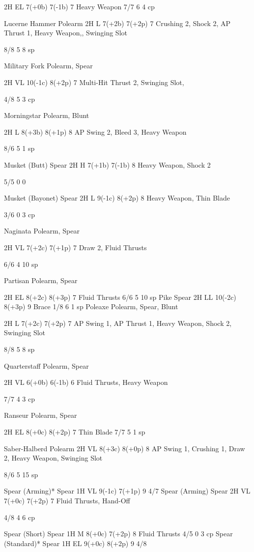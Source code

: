 \documentclass[oneside,11pt,english]{book}
\begin{document}
2H EL 7(+0b) 7(-1b) 7 Heavy Weapon 7/7 6 4 cp 

Lucerne Hammer Polearm 2H L 7(+2b) 7(+2p) 7 Crushing 2, Shock 
2, AP Thrust 1, 
Heavy Weapon,, 
Swinging Slot 

8/8 5 8 sp 

Military Fork Polearm, 
Spear 

2H VL 10(-1c) 8(+2p) 7 Multi-Hit Thrust 2, 
Swinging Slot, 

4/8 5 3 cp 

Morningstar Polearm, 
Blunt 

2H L 8(+3b) 8(+1p) 8 AP Swing 2, Bleed 
3, Heavy Weapon 

8/6 5 1 sp 

Musket (Butt) Spear 2H H 7(+1b) 7(-1b) 8 Heavy Weapon, 
Shock 2 

5/5 0 0 

Musket (Bayonet) Spear 2H L 9(-1c) 8(+2p) 8 Heavy Weapon, 
Thin Blade 

3/6 0 3 cp 

Naginata Polearm, 
Spear 

2H VL 7(+2c) 7(+1p) 7 Draw 2, Fluid 
Thrusts 

6/6 4 10 
sp 

Partisan Polearm, 
Spear 

2H EL 8(+2c) 8(+3p) 7 Fluid Thrusts 6/6 5 10 
sp 
Pike Spear 2H LL 10(-2c) 8(+3p) 9 Brace 1/8 6 1 sp 
Poleaxe Polearm, 
Spear, 
Blunt 

2H L 7(+2c) 7(+2p) 7 AP Swing 1, AP 
Thrust 1, Heavy 
Weapon, Shock 2, 
Swinging Slot 

8/8 5 8 sp 

Quarterstaff Polearm, 
Spear 

2H VL 6(+0b) 6(-1b) 6 Fluid Thrusts, 
Heavy Weapon 

7/7 4 3 cp 

Ranseur Polearm, 
Spear 

2H EL 8(+0c) 8(+2p) 7 Thin Blade 7/7 5 1 sp 

Saber-Halberd Polearm 2H VL 8(+3c) 8(+0p) 8 AP Swing 1, 
Crushing 1, Draw 
2, Heavy Weapon, 
Swinging Slot 

8/6 5 15 
sp 

Spear (Arming)* Spear 1H VL 9(-1c) 7(+1p) 9 4/7 
Spear (Arming) Spear 2H VL 7(+0c) 7(+2p) 7 Fluid Thrusts, 
Hand-Off 

4/8 4 6 cp 

Spear (Short) Spear 1H M 8(+0c) 7(+2p) 8 Fluid Thrusts 4/5 0 3 cp 
Spear (Standard)* Spear 1H EL 9(+0c) 8(+2p) 9 4/8 
\end{document}
